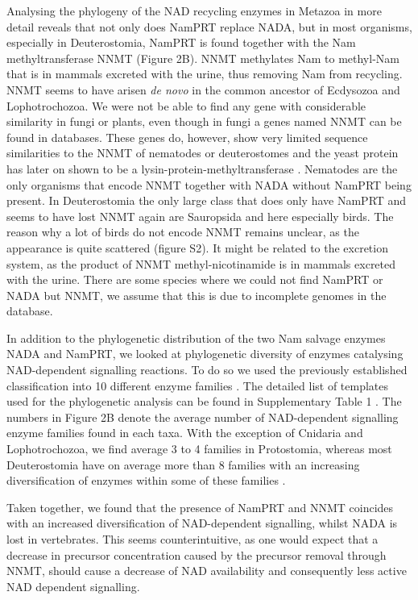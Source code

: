 Analysing the phylogeny of the NAD recycling enzymes in Metazoa in more detail reveals that not only does NamPRT replace NADA, but in most organisms, especially in Deuterostomia, NamPRT is found together with the Nam methyltransferase NNMT (Figure 2B). NNMT methylates Nam to methyl-Nam that is in mammals excreted with the urine, thus removing Nam from recycling. NNMT seems to have arisen \textit{de novo} in the common ancestor of Ecdysozoa and Lophotrochozoa. We were not be able to find any gene with considerable similarity in fungi or plants, even though in fungi a genes named NNMT can be found in databases. These genes do, however, show very limited sequence similarities to the NNMT of nematodes or deuterostomes and the yeast protein has later on shown to be a lysin-protein-methyltransferase \cite{Wlodarski2011}. Nematodes are the only organisms that encode NNMT together with NADA without NamPRT being present. In Deuterostomia the only large class that does only have NamPRT and seems to have lost NNMT again are Sauropsida and here especially birds. The reason why a lot of birds do not encode NNMT remains unclear, as the appearance is quite scattered (figure S2). It might be related to the excretion system, as the product of NNMT methyl-nicotinamide is in mammals excreted with the urine. There are some species where we could not find NamPRT or NADA but NNMT, we assume that this is due to incomplete genomes in the database.

In addition to the phylogenetic distribution of the two Nam salvage enzymes NADA and NamPRT, we looked at phylogenetic diversity of enzymes catalysing NAD-dependent signalling reactions. To do so we used the previously established classification into 10 different enzyme families \cite{Gossmann2012FEBS}. The detailed list of templates used for the phylogenetic analysis can be found in Supplementary Table 1 . The numbers in Figure 2B denote the average number of NAD-dependent signalling enzyme families found in each taxa. With the exception of Cnidaria and Lophotrochozoa, we find average 3 to 4 families in Protostomia, whereas most Deuterostomia have on average more than 8 families with an increasing diversification of enzymes within some of these families \cite{Gossmann2014DNAR}.

Taken together, we found that the presence of NamPRT and NNMT coincides with an increased diversification of NAD-dependent signalling, whilst NADA is lost in vertebrates. This seems counterintuitive, as one would expect that a decrease in precursor concentration caused by the precursor removal through NNMT, should cause a decrease of NAD availability and consequently less active NAD dependent signalling.


